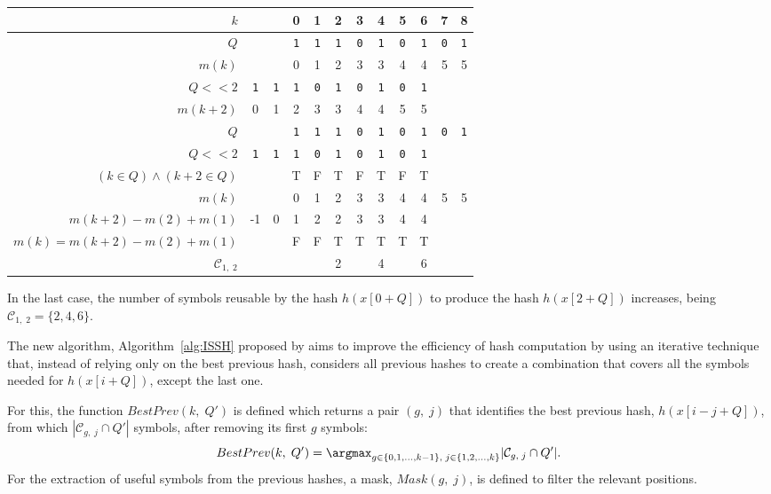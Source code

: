 \begin{example}
	\begin{center}
		\begin{tabular}{r || cc|ccccccc|cc}
			$k$ & & & 0 & 1 & 2 & 3 & 4 & 5 & 6 & 7 & 8 \\
			\midrule
			$Q$ & & & \texttt{1} & \texttt{1} & \texttt{1} & \texttt{0} & \texttt{1} & \texttt{0} & \texttt{1} & \texttt{0} & \texttt{1} \\
			$m(k)$ & & & 0 & 1 & 2 & 3 & 3 & 4 & 4 & 5 & 5 \\
			\midrule
			$Q <\!< 2$ & \texttt{1} & \texttt{1} & \texttt{1} & \texttt{0} & \texttt{1} & \texttt{0} & \texttt{1} & \texttt{0} & \texttt{1} & & \\
			$m(k + 2)$ & 0 & 1 & 2 & 3 & 3 & 4 & 4 & 5 & 5 & & \\
			\midrule
			$Q$ & & & \texttt{1} & \texttt{1} & \texttt{1} & \texttt{0} & \texttt{1} & \texttt{0} & \texttt{1} & \texttt{0} & \texttt{1} \\
			$Q <\!< 2$ & \texttt{1} & \texttt{1} & \texttt{1} & \texttt{0} & \texttt{1} & \texttt{0} & \texttt{1} & \texttt{0} & \texttt{1} & & \\
			$(k \in Q) \wedge (k + 2 \in Q)$ & & & T & F & T & F & T & F & T & & \\
			\midrule
			$m(k)$ & & & 0 & 1 & 2 & 3 & 3 & 4 & 4 & 5 & 5 \\
			$m(k + 2) - m(2) + m(1)$ & -1 & 0 & 1 & 2 & 2 & 3 & 3 & 4 & 4 & & \\
			$m(k) = m(k + 2) - m(2) + m(1)$ & & & F & F & T & T & T & T & T & & \\
			\midrule
			$\mathcal{C}_{1,\; 2}$ & & & & & 2 & & 4 & & 6 & & \\
		\end{tabular}
	\end{center}
	
	In the last case, the number of symbols reusable by the hash $h(x[0 + Q])$ to produce the hash $h(x[2 + Q])$ increases, being $\mathcal{C}_{1,\; 2} = \{ 2, 4, 6 \}$.
\end{example}

The new algorithm, Algorithm~\ref{alg:ISSH} proposed by \citeauthor*{petrucci2020issh} aims to improve the efficiency of hash computation by using an iterative technique that, instead of relying only on the best previous hash, considers all previous hashes to create a combination that covers all the symbols needed for $h(x[i + Q])$, except the last one.

For this, the function $BestPrev(k,\; Q')$ is defined which returns a pair $(g,\; j)$ that identifies the best previous hash, $h(x[i - j + Q])$, from which $|\mathcal{C}_{g,\; j} \cap Q'|$ symbols, after removing its first $g$ symbols: \[ BestPrev(k,\; Q') = \argmax_{g \in \{ 0, 1, \dots, k - 1 \},\; j \in \{ 1, 2, \dots, k \}} |\mathcal{C}_{g,\; j} \cap Q'|. \] For the extraction of useful symbols from the previous hashes, a mask, $Mask(g,\; j)$, is defined to filter the relevant positions.

